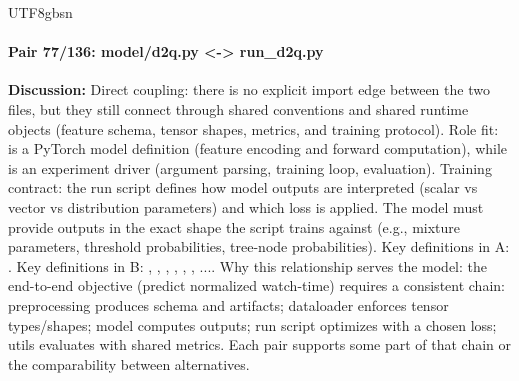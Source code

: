 \documentclass[11pt]{article}
\begin{document}
\begin{CJK*}{UTF8}{gbsn}
\paragraph{Pair 77/136: model/d2q.py <-> run\_d2q.py}
\textbf{Discussion:} Direct coupling: there is no explicit import edge between the two files, but they still connect through shared conventions and shared runtime objects (feature schema, tensor shapes, metrics, and training protocol). Role fit: \texttt{} is a PyTorch model definition (feature encoding and forward computation), while \texttt{} is an experiment driver (argument parsing, training loop, evaluation). Training contract: the run script defines how model outputs are interpreted (scalar vs vector vs distribution parameters) and which loss is applied. The model must provide outputs in the exact shape the script trains against (e.g., mixture parameters, threshold probabilities, tree-node probabilities). Key definitions in A: \texttt{}. Key definitions in B: \texttt{}, \texttt{}, \texttt{}, \texttt{}, \texttt{}, \texttt{}, .... Why this relationship serves the model: the end-to-end objective (predict normalized watch-time) requires a consistent chain: preprocessing produces schema and artifacts; dataloader enforces tensor types/shapes; model computes outputs; run script optimizes with a chosen loss; utils evaluates with shared metrics. Each pair supports some part of that chain or the comparability between alternatives.


\end{CJK*}
\end{document}
